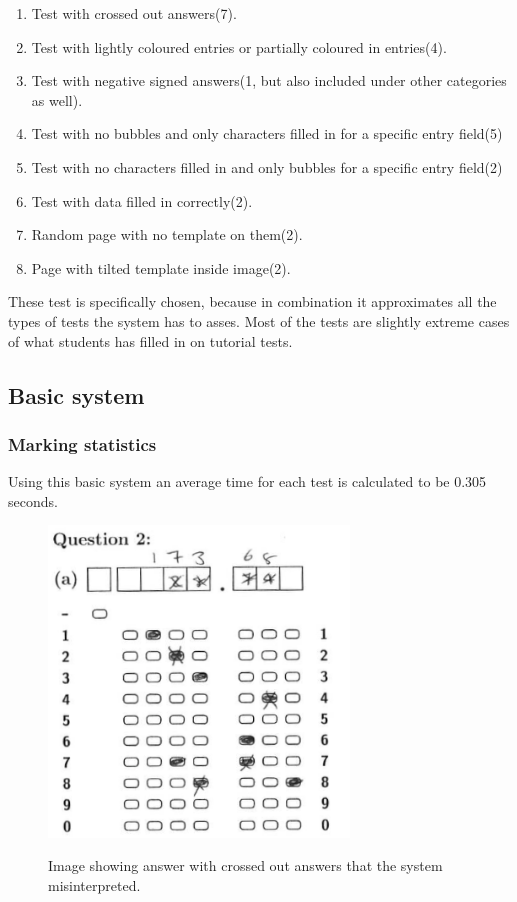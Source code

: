 \begin{enumerate}
\item Test with crossed out answers(7).
\item Test with lightly coloured entries or partially coloured in entries(4).
\item Test with negative signed answers(1, but also included under other categories as well).
\item Test with no bubbles and only characters filled in for a specific entry field(5)
\item Test with no characters filled in and only bubbles for a specific entry field(2)
\item Test with data filled in correctly(2).
\item Random page with no template on them(2).
\item Page with tilted template inside image(2).
\end{enumerate}

These test is specifically chosen, because in combination it approximates all the types of tests the system has to asses. Most of the tests are slightly extreme cases of what students has filled in on tutorial tests. 

\subsection{Basic system}


\subsubsection{Marking statistics}

Using this basic system an average time for each test is calculated to be 0.305 seconds. 

\begin{figure}
  \centering
  \includegraphics[width=8cm]{crossClash}\\
  \caption{Image showing answer with crossed out answers that the system misinterpreted.}
  \label{fig:crossClash}
\end{figure}

